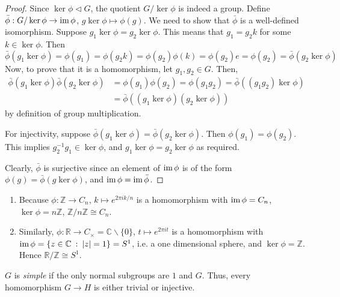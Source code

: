 \documentclass[10pt, a4paper, twoside]{report}
\begin{document}
\begin{proof}
    Since \(\ker\phi\lhd G\), the quotient \(G/\ker\phi\) is indeed a group. Define \(\bar\phi:G/\ker\phi\to\operatorname{im}\phi\), \(g\ker\phi\mapsto\phi(g)\). We need to show that \(\bar{\phi}\) is a well-defined isomorphism. Suppose \(g_1\ker\phi=g_2\ker\phi\). This means that \(g_1=g_2k\) for some \(k\in\ker\phi\). Then \[\bar\phi(g_1\ker\phi)=\phi(g_1)=\phi(g_2k)=\phi(g_2)\phi(k)=\phi(g_2)e=\phi(g_2)=\bar\phi(g_2\ker\phi)\]
    Now, to prove that it is a homomorphism, let \(g_1,g_2\in G\). Then,
    \begin{align*}
        \bar\phi(g_1\ker\phi)\bar\phi(g_2\ker\phi)&=\phi(g_1)\phi(g_2)=\phi(g_1g_2)=\bar\phi((g_1g_2)\ker\phi)\\&=\bar\phi((g_1\ker\phi)(g_2\ker\phi))
    \end{align*}
    by definition of group multiplication.

    For injectivity, suppose \(\bar\phi(g_1\ker\phi)=\bar\phi(g_2\ker\phi)\). Then \(\phi(g_1)=\phi(g_2)\). This implies \(g_2^{-1}g_1\in\ker\phi\), and \(g_1\ker\phi=g_2\ker\phi\) as required.

    Clearly, \(\bar\phi\) is surjective since an element of \(\operatorname{im}\phi\) is of the form \(\phi(g)=\bar\phi(g\ker\phi)\), and \(\operatorname{im}\phi=\operatorname{im}\bar\phi\).
\end{proof}
\begin{example} \item[] 
    \begin{enumerate}
        \item Because \(\phi:\mathbb{Z}\to C_n\), \(k\mapsto e^{2\pi ik/n}\) is a homomorphism with \(\operatorname{im}\phi=C_n\), \(\ker\phi=n\mathbb{Z}\), \(\mathbb{Z}/n\mathbb{Z}\cong C_n\).
        \item Similarly, \(\phi:\mathbb{R}\to C_\times=\mathbb{C}\backslash\{0\}\), \(t\mapsto e^{2\pi it}\) is a homomorphism with \(\operatorname{im}\phi=\{z\in\mathbb{C}\::\:|z|=1\}=S^1\), i.e. a one dimensional sphere, and \(\ker\phi=\mathbb{Z}\). Hence \(\mathbb{R}/\mathbb{Z}\cong S^1\).
    \end{enumerate}
\end{example}
\begin{definition}
    \(G\) is \emph{simple} if the only normal subgroups are \(1\) and \(G\). Thus, every homomorphism \(G\to H\) is either trivial or injective.
\end{definition}
\end{document}
